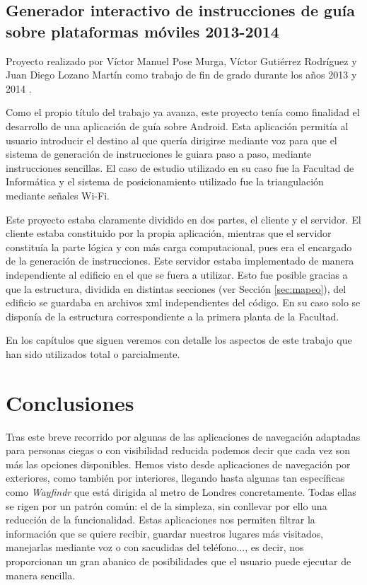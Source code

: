 \subsection{Generador interactivo de instrucciones de guía sobre plataformas móviles 2013-2014}
\label{sub:genInterTFG}


Proyecto realizado por Víctor Manuel Pose Murga, Víctor Gutiérrez Rodríguez y Juan Diego Lozano Martín como trabajo de fin de grado durante los años 2013 y 2014 \citep{TFGguia}. 

Como el propio título del trabajo ya avanza, este proyecto tenía como finalidad el desarrollo de una aplicación de guía sobre Android. Esta aplicación permitía al usuario introducir el destino al que quería dirigirse mediante voz para que el sistema de generación de instrucciones le guiara paso a paso, mediante instrucciones sencillas. El caso de estudio utilizado en su caso fue la Facultad de Informática y el sistema de posicionamiento utilizado fue la triangulación mediante señales Wi-Fi.

Este proyecto estaba claramente dividido en dos partes, el cliente y el servidor. El cliente estaba constituido por la propia aplicación, mientras que el servidor constituía la parte lógica y con más carga computacional, pues era el encargado de la generación de instrucciones. Este servidor estaba implementado de manera independiente al edificio en el que se fuera a utilizar. Esto fue posible gracias a que la estructura, dividida en distintas secciones (ver Sección \ref{sec:mapeo}), del edificio se guardaba en archivos xml independientes del código. En su caso solo se disponía de la estructura correspondiente a la primera planta de la Facultad.

En los capítulos que siguen veremos con detalle los aspectos de este trabajo que han sido utilizados total o parcialmente.


\section{Conclusiones}
\label{sec:conclusionesposicionamiento}

Tras este breve recorrido por algunas de las aplicaciones de navegación adaptadas para personas ciegas o con visibilidad reducida podemos decir que cada vez son más las opciones disponibles. Hemos visto desde aplicaciones de navegación por exteriores, como también por interiores, llegando hasta algunas tan específicas como \textit{Wayfindr} que está dirigida al metro de Londres concretamente. Todas ellas se rigen por un patrón común: el de la simpleza, sin conllevar por ello una reducción de la funcionalidad. Estas aplicaciones nos permiten filtrar la información que se quiere recibir, guardar nuestros lugares más visitados, manejarlas mediante voz o con sacudidas del teléfono..., es decir, nos proporcionan un gran abanico de posibilidades que el usuario puede ejecutar de manera sencilla.

